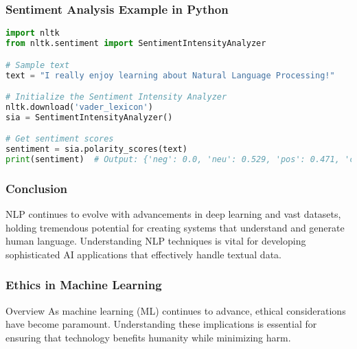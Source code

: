 \documentclass[aspectratio=169]{beamer}
\begin{document}
\begin{frame}[fragile]
    \frametitle{Sentiment Analysis Example in Python}
    \begin{lstlisting}[language=Python]
import nltk
from nltk.sentiment import SentimentIntensityAnalyzer

# Sample text
text = "I really enjoy learning about Natural Language Processing!"

# Initialize the Sentiment Intensity Analyzer
nltk.download('vader_lexicon')
sia = SentimentIntensityAnalyzer()

# Get sentiment scores
sentiment = sia.polarity_scores(text)
print(sentiment)  # Output: {'neg': 0.0, 'neu': 0.529, 'pos': 0.471, 'compound': 0.6369}
    \end{lstlisting}
\end{frame}

\begin{frame}
    \frametitle{Conclusion}
    NLP continues to evolve with advancements in deep learning and vast datasets, 
    holding tremendous potential for creating systems that understand and generate 
    human language. Understanding NLP techniques is vital for developing sophisticated 
    AI applications that effectively handle textual data.
\end{frame}

\begin{frame}[fragile]
    \frametitle{Ethics in Machine Learning}
    \begin{block}{Overview}
        As machine learning (ML) continues to advance, ethical considerations have become paramount. Understanding these implications is essential for ensuring that technology benefits humanity while minimizing harm.
    \end{block}
\end{frame}
\end{document}
